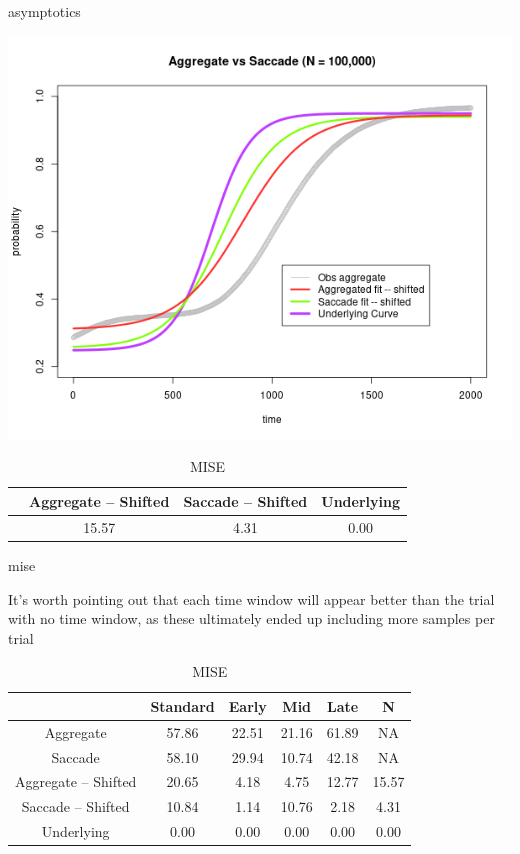 \documentclass{beamer}
\begin{document}
\begin{frame}{asymptotics}
\begin{center}
\includegraphics[scale=0.35]{img/asy_fit.png}
\end{center}
{\scriptsize
\begin{table}[ht]
\captionsetup{font=scriptsize}
\caption*{MISE}
\centering
\begin{tabular}{cccc}
 \hline
 & Aggregate -- Shifted & Saccade -- Shifted & Underlying \\ 
  \hline
  & 15.57 & 4.31 & 0.00 \\ 
   \hline
\end{tabular}
\end{table}
}
\end{frame}

\begin{frame}{mise}

It's worth pointing out that each time window will appear better than the trial with no time window, as these ultimately ended up including more samples per trial

{\scriptsize
\begin{table}[ht]
\centering
\captionsetup{font=scriptsize}
\caption*{MISE}
\begin{tabular}{cccccc}
  \hline
 & Standard & Early & Mid & Late & N \\ 
  \hline
Aggregate & 57.86 & 22.51 & 21.16 & 61.89 & NA \\ 
  Saccade & 58.10 & 29.94 & 10.74 & 42.18 & NA \\ 
  Aggregate -- Shifted & 20.65 & 4.18 & 4.75 & 12.77 & 15.57 \\ 
  Saccade -- Shifted & 10.84 & 1.14 & 10.76 & 2.18 & 4.31 \\ 
  Underlying & 0.00 & 0.00 & 0.00 & 0.00 & 0.00 \\ 
   \hline
\end{tabular}
\end{table}
}
\end{frame}
\end{document}
